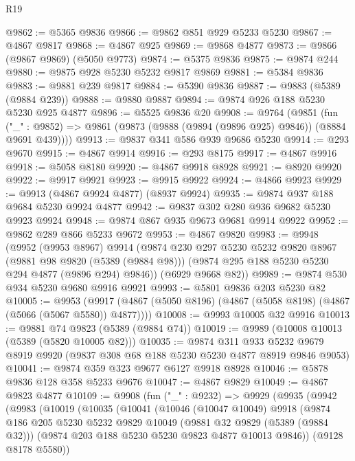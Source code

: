 \begin{lexlean}{R19}
\begin{coremodule}
@9862 := @5365 @9836
@9866 := @9862 @851 @929 @5233 @5230
@9867 := @4867 @9817
@9868 := @4867 @925
@9869 := @9868 @4877
@9873 := @9866 (@9867 @9869) (@5050 @9773)
@9874 := @5375 @9836
@9875 := @9874 @244
@9880 := @9875 @928 @5230 @5232 @9817 @9869
@9881 := @5384 @9836
@9883 := @9881 @239 @9817
@9884 := @5390 @9836
@9887 := @9883 (@5389 (@9884 @239))
@9888 := @9880 @9887
@9894 := @9874 @926 @188 @5230 @5230 @925 @4877
@9896 := @5525 @9836 @20
@9908 := @9764
    (@9851
      (fun ("_" : @9852) => @9861 (@9873 (@9888 (@9894 (@9896 @925) @9846)) (@8884 @9691 @439))))
@9913 := @9837 @341 @586 @939 @9686 @5230
@9914 := @293 @9670
@9915 := @4867 @9914
@9916 := @293 @8175
@9917 := @4867 @9916
@9918 := @5058 @8180
@9920 := @4867 @9918 @8928
@9921 := @8920 @9920
@9922 := @9917 @9921
@9923 := @9915 @9922
@9924 := @4866 @9923
@9929 := @9913 (@4867 @9924 @4877) (@8937 @9924)
@9935 := @9874 @937 @188 @9684 @5230 @9924 @4877
@9942 := @9837 @302 @280 @936 @9682 @5230 @9923 @9924
@9948 := @9874 @867 @935 @9673 @9681 @9914 @9922
@9952 := @9862 @289 @866 @5233 @9672
@9953 := @4867 @9820
@9983 := @9948
    (@9952
      (@9953 @8967)
      @9914
      (@9874
        @230
        @297
        @5230
        @5232
        @9820
        @8967
        (@9881 @98 @9820 (@5389 (@9884 @98)))
        (@9874 @295 @188 @5230 @5230 @294 @4877 (@9896 @294) @9846))
      (@6929 @9668 @82))
@9989 := @9874 @530 @934 @5230 @9680 @9916 @9921
@9993 := @5801 @9836 @203 @5230 @82
@10005 := @9953
    (@9917 (@4867 (@5050 @8196) (@4867 (@5058 @8198) (@4867 (@5066 (@5067 @5580)) @4877))))
@10008 := @9993 @10005 @32 @9916
@10013 := @9881 @74 @9823 (@5389 (@9884 @74))
@10019 := @9989 (@10008 @10013 (@5389 (@5820 @10005 @82)))
@10035 := @9874
    @311
    @933
    @5232
    @9679
    @8919
    @9920
    (@9837 @308 @68 @188 @5230 @5230 @4877 @8919 @9846 @9053)
@10041 := @9874 @359 @323 @9677 @6127 @9918 @8928
@10046 := @5878 @9836 @128 @358 @5233 @9676
@10047 := @4867 @9829
@10049 := @4867 @9823 @4877
@10109 := @9908
    (fun ("_" : @9232) =>
    @9929
      (@9935
        (@9942
          (@9983
            (@10019
              (@10035
                (@10041
                  (@10046
                    (@10047 @10049)
                    @9918
                    (@9874
                      @186
                      @205
                      @5230
                      @5232
                      @9829
                      @10049
                      (@9881 @32 @9829 (@5389 (@9884 @32)))
                      (@9874 @203 @188 @5230 @5230 @9823 @4877 @10013 @9846))
                    (@9128 @8178 @5580))

\end{coremodule}
\end{lexlean}
